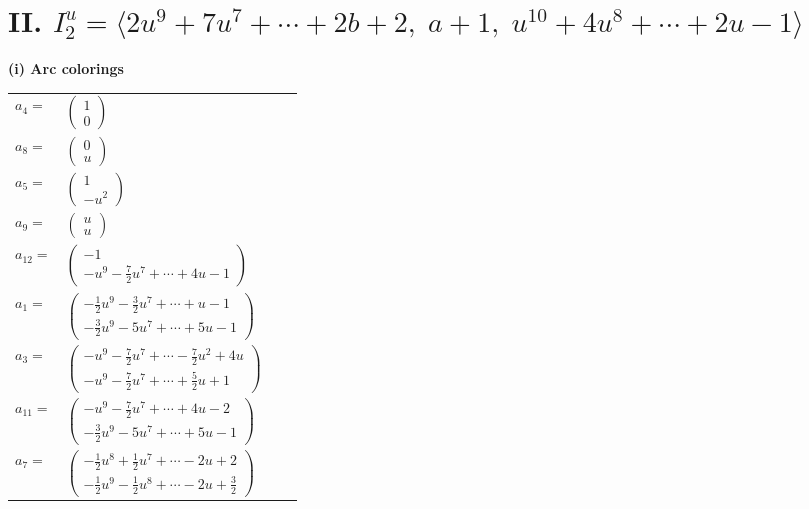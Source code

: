 \documentclass[1p]{elsarticle_modified}
\theoremstyle{definition}
\begin{document}
\centering \section*{II. $I^u_{2}= \langle 2 u^9+7 u^7+\cdots+2 b+2,\;a+1,\;u^{10}+4 u^8+\cdots+2 u-1 \rangle$}
\flushleft \textbf{(i) Arc colorings}\\
\begin{tabular}{m{7pt} m{180pt} m{7pt} m{180pt} }
\flushright $a_{4}=$&$\begin{pmatrix}1\\0\end{pmatrix}$ \\
\flushright $a_{8}=$&$\begin{pmatrix}0\\u\end{pmatrix}$ \\
\flushright $a_{5}=$&$\begin{pmatrix}1\\- u^2\end{pmatrix}$ \\
\flushright $a_{9}=$&$\begin{pmatrix}u\\u\end{pmatrix}$ \\
\flushright $a_{12}=$&$\begin{pmatrix}-1\\- u^9-\frac{7}{2} u^7+\cdots+4 u-1\end{pmatrix}$ \\
\flushright $a_{1}=$&$\begin{pmatrix}-\frac{1}{2} u^9-\frac{3}{2} u^7+\cdots+u-1\\-\frac{3}{2} u^9-5 u^7+\cdots+5 u-1\end{pmatrix}$ \\
\flushright $a_{3}=$&$\begin{pmatrix}- u^9-\frac{7}{2} u^7+\cdots-\frac{7}{2} u^2+4 u\\- u^9-\frac{7}{2} u^7+\cdots+\frac{5}{2} u+1\end{pmatrix}$ \\
\flushright $a_{11}=$&$\begin{pmatrix}- u^9-\frac{7}{2} u^7+\cdots+4 u-2\\-\frac{3}{2} u^9-5 u^7+\cdots+5 u-1\end{pmatrix}$ \\
\flushright $a_{7}=$&$\begin{pmatrix}-\frac{1}{2} u^8+\frac{1}{2} u^7+\cdots-2 u+2\\-\frac{1}{2} u^9-\frac{1}{2} u^8+\cdots-2 u+\frac{3}{2}\end{pmatrix}$ \\

\end{tabular}
\end{document}

